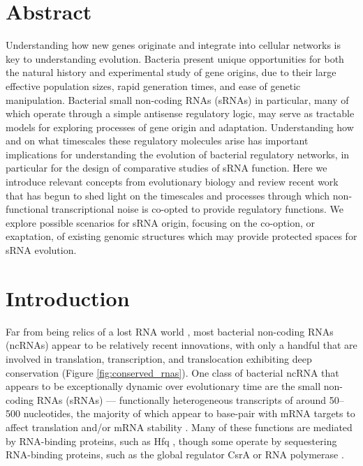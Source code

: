 \section{Abstract}
Understanding how new genes originate and integrate into cellular networks is key to understanding evolution. Bacteria present unique opportunities for both the natural history and experimental study of gene origins, due to their large effective population sizes, rapid generation times, and ease of genetic manipulation. Bacterial small non-coding RNAs (sRNAs) in particular, many of which operate through a simple antisense regulatory logic, may serve as tractable models for exploring processes of gene origin and adaptation. Understanding how and on what timescales these regulatory molecules arise has important implications for understanding the evolution of bacterial regulatory networks, in particular for the design of comparative studies of sRNA function. Here we introduce relevant concepts from evolutionary biology and review recent work that has begun to shed light on the timescales and processes through which non-functional transcriptional noise is co-opted to provide regulatory functions. We explore possible scenarios for sRNA origin, focusing on the co-option, or exaptation, of existing genomic structures which may provide protected spaces for sRNA evolution.

\section{Introduction}

Far from being relics of a lost RNA world \citep{Eddy2001-jv}, most bacterial non-coding RNAs (ncRNAs) appear to be relatively recent innovations, with only a handful that are involved in translation, transcription, and translocation exhibiting deep conservation \citep{Hoeppner2012-pl} (Figure \ref{fig:conserved_rnas}).
One class of bacterial ncRNA that appears to be exceptionally dynamic over evolutionary time are the small non-coding RNAs (sRNAs) --- functionally heterogeneous transcripts of around 50--500 nucleotides, the majority of which appear to base-pair with mRNA targets to affect translation and/or mRNA stability \citep{Gorski2017-wu}.
Many of these functions are mediated by RNA-binding proteins, such as Hfq \citep{Vogel2011-gh}, though some operate by sequestering RNA-binding proteins, such as the global regulator CsrA \citep{Romeo2018-wb} or RNA polymerase \citep{Wassarman2007-de}.
\par

